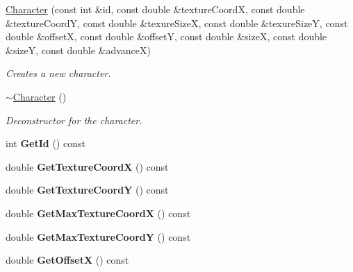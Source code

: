\begin{DoxyCompactItemize}
\item 
\hyperlink{class_flounder_1_1_character_a624a59b50c5f4ad99ed5c29b5acbea6f}{Character} (const int \&id, const double \&texture\+CoordX, const double \&texture\+CoordY, const double \&texure\+SizeX, const double \&texure\+SizeY, const double \&offsetX, const double \&offsetY, const double \&sizeX, const double \&sizeY, const double \&advanceX)
\begin{DoxyCompactList}\small\item\em Creates a new character. \end{DoxyCompactList}\item 
\hyperlink{class_flounder_1_1_character_ad4d44405663f7975475e8ad1048a9f0d}{$\sim$\+Character} ()
\begin{DoxyCompactList}\small\item\em Deconstructor for the character. \end{DoxyCompactList}\item 
\mbox{\label{class_flounder_1_1_character_ad7631c13024436ddd62e386d8e276bf3}} 
int {\bfseries Get\+Id} () const
\item 
\mbox{\label{class_flounder_1_1_character_a076516d89efa5233e695a7075d3ee855}} 
double {\bfseries Get\+Texture\+CoordX} () const
\item 
\mbox{\label{class_flounder_1_1_character_a3e88d75bad82784a0239ac386219b910}} 
double {\bfseries Get\+Texture\+CoordY} () const
\item 
\mbox{\label{class_flounder_1_1_character_ad14b41cda929727525ddfabd2112e239}} 
double {\bfseries Get\+Max\+Texture\+CoordX} () const
\item 
\mbox{\label{class_flounder_1_1_character_aa629dcca94becaf90a5f1b93514f5e2f}} 
double {\bfseries Get\+Max\+Texture\+CoordY} () const
\item 
\mbox{\label{class_flounder_1_1_character_adf900d50d6320fb67cefb96551325e81}} 
double {\bfseries Get\+OffsetX} () const
\item 
\mbox{\label{class_flounder_1_1_character_ad22f040c2a5b2a37b24172ac9a2ee0fe}} 

\end{DoxyCompactItemize}
